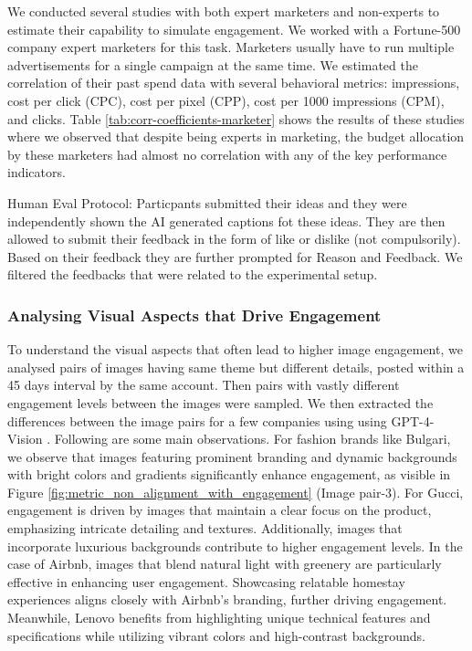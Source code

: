  
 We conducted several studies with both expert marketers and non-experts to estimate their capability to simulate engagement. We worked with a Fortune-500 company expert marketers for this task. Marketers usually have to run multiple advertisements for a single campaign at the same time. We estimated the correlation of their past spend data with several behavioral metrics: impressions, cost per click (CPC), cost per pixel (CPP), cost per 1000 impressions (CPM), and clicks. Table \ref{tab:corr-coefficients-marketer} shows the results of these studies where we observed that despite being experts in marketing, the budget allocation by these marketers had almost no correlation with any of the key performance indicators. 
 
 Human Eval Protocol: Particpants submitted their ideas and they were independently shown the AI generated captions fot these ideas. They are then allowed to submit their feedback in the form of like or dislike (not compulsorily). Based on their feedback they are further prompted for Reason and Feedback. We filtered the feedbacks that were related to the experimental setup. 
 



\subsubsection{Analysing Visual Aspects that Drive Engagement}
\label{sec:Analysing Visual Aspects that Drive Engagement}
To understand the visual aspects that often lead to higher image engagement, we analysed pairs of images having same theme but different details, posted within a 45 days interval by the same account. Then pairs with vastly different engagement levels between the images were sampled. We then extracted the differences between the image pairs for a few companies using using GPT-4-Vision \cite{openai2023gpt4}. Following are some main observations. For fashion brands like Bulgari, we observe that images featuring prominent branding and dynamic backgrounds with bright colors and gradients significantly enhance engagement, as visible in Figure \ref{fig:metric_non_alignment_with_engagement} (Image pair-3).
For Gucci, engagement is driven by images that maintain a clear focus on the product, emphasizing intricate detailing and textures. Additionally, images that incorporate luxurious backgrounds contribute to higher engagement levels.
In the case of Airbnb, images that blend natural light with greenery are particularly effective in enhancing user engagement. Showcasing relatable homestay experiences aligns closely with Airbnb's branding, further driving engagement.
Meanwhile, Lenovo benefits from highlighting unique technical features and specifications while utilizing vibrant colors and high-contrast backgrounds.




